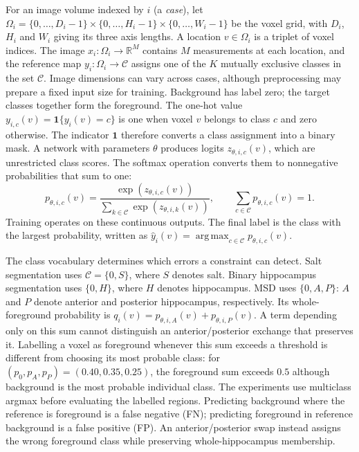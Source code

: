 \documentclass[12pt,a4paper]{article}
\begin{document}
For an image volume indexed by $i$ (a \emph{case}), let
$\Omega_i=\{0,\ldots,D_i-1\}\times\{0,\ldots,H_i-1\}\times
\{0,\ldots,W_i-1\}$ be the voxel grid, with $D_i$, $H_i$ and $W_i$
giving its three axis lengths. A location $v\in\Omega_i$ is a triplet
of voxel indices. The image
$x_i:\Omega_i\to\mathbb R^M$ contains $M$ measurements at each location,
and the reference map $y_i:\Omega_i\to\mathcal C$ assigns one of the $K$
mutually exclusive classes in the set $\mathcal C$. Image dimensions can
vary across cases, although preprocessing may prepare a fixed input size
for training. Background has label zero; the target classes together
form the foreground. The one-hot value
$y_{i,c}(v)=\mathbf1\{y_i(v)=c\}$ is one when voxel $v$ belongs to
class $c$ and zero otherwise. The indicator $\mathbf1$ therefore converts
a class assignment into a binary mask. A network with parameters $\theta$ produces logits
$z_{\theta,i,c}(v)$, which are unrestricted class scores. The softmax
operation converts them to nonnegative probabilities that sum to one:
\begin{equation}
p_{\theta,i,c}(v)=
\frac{\exp(z_{\theta,i,c}(v))}
{\sum_{k\in\mathcal{C}}\exp(z_{\theta,i,k}(v))},
\qquad
\sum_{c\in\mathcal{C}}p_{\theta,i,c}(v)=1.
\label{eq:segmentation-softmax}
\end{equation}
Training operates on these continuous outputs. The final label is the
class with the largest probability, written as
$\widehat y_i(v)=\operatorname{arg\,max}_{c\in\mathcal C}
p_{\theta,i,c}(v)$. 

The class vocabulary determines which errors a constraint can detect. Salt
segmentation uses $\mathcal C=\{0,S\}$, where $S$ denotes salt. Binary
hippocampus segmentation uses $\{0,H\}$, where $H$ denotes hippocampus. MSD
uses $\{0,A,P\}$: $A$ and $P$ denote anterior and posterior hippocampus,
respectively. Its whole-foreground probability is
$q_i(v)=p_{\theta,i,A}(v)+p_{\theta,i,P}(v)$. A term depending only on this
sum cannot distinguish an anterior/posterior exchange that preserves it.
Labelling a voxel as foreground whenever this sum exceeds a threshold is
different from choosing its most probable class: for
$(p_0,p_A,p_P)=(0.40,0.35,0.25)$, the foreground sum exceeds $0.5$ although
background is the most probable individual class. The experiments use
multiclass argmax before evaluating the labelled regions. Predicting
background where the reference is foreground is a false negative (FN);
predicting foreground in reference background is a false positive (FP). An
anterior/posterior swap instead assigns the wrong foreground class while
preserving whole-hippocampus membership.
\end{document}
